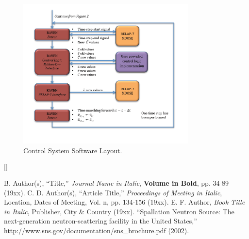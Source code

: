\documentclass{mc2013}
\begin{document}
\begin{figure}[h] \label{fig:CalcFlow2}
  \centering
     \includegraphics[width=0.8\textwidth]{figures/CalculationFlow_part_2.PNG}
  \caption{Control System Software Layout.}
\end{figure}

[]


\setlength{\baselineskip}{12pt}
\begin{thebibliography}{300}
 B. Author(s), ``Title,'' {\it Journal Name in Italic}, 
          {\bf Volume in Bold}, pp. 34-89 (19xx).
 C. D. Author(s), ``Article Title,'' {\it Proceedings of
          Meeting in Italic}, Location, Dates of Meeting, Vol. n, pp. 134-156 
          (19xx).
 E. F. Author, {\it Book Title in Italic}, Publisher, City \&
          Country (19xx). 
 ``Spallation Neutron Source: The next-generation 
          neutron-scattering facility in the United States,'' 
          http://www.sns.gov/documentation/sns\_brochure.pdf (2002).
\end{thebibliography}
\end{document}
